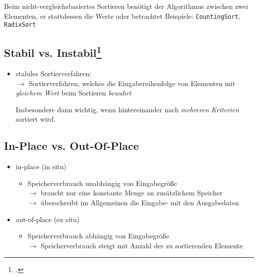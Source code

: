 \documentclass{bschlangaul-theorie}
\begin{document}
Beim nicht-vergleichsbasiertes Sortieren benötigt der Algorithmus
 zwischen zwei Elementen, er
 stattdessen die Werte oder betrachtet  Beispiele: \verb|CountingSort|, \verb|RadixSort|

%

\subsection{Stabil vs. Instabil\footcite[Seite 36]{aud:fs:tafeluebung-11}}

\begin{itemize}
\item stabiles Sortierverfahren:\\
%
$\rightarrow$ Sortierverfahren, welches die Eingabereihenfolge von
Elementen mit \emph{gleichem Wert} beim Sortieren \emph{bewahrt}

Insbesondere dann wichtig, wenn hintereinander nach \emph{mehreren
Kriterien} sortiert wird.
\end{itemize}

%

\subsection{In-Place vs. Out-Of-Place}

\begin{itemize}

%

\item in-place (in situ)

\begin{itemize}
\item Speicherverbrauch unabhängig von Eingabegröße\\
%
$\rightarrow$ braucht nur eine konstante Menge an zusätzlichem
Speicher\\
%
$\rightarrow$ überschreibt im Allgemeinen die Eingabe- mit den
Ausgabedaten
\end{itemize}

%

\item out-of-place (ex situ)

\begin{itemize}
\item Speicherverbrauch abhängig von Eingabegröße\\
%
$\rightarrow$ Speicherverbrauch steigt mit Anzahl der zu sortierenden
Elemente
\end{itemize}

\end{itemize}
\end{document}
